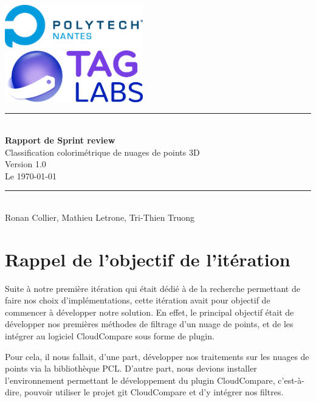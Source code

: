 \documentclass[12pt,titlepage,french]{article}
\begin{document}

\begin{titlepage}
\newcommand{\HRule}{\rule{\linewidth}{0.5mm}}
\center

  \includegraphics[width=0.45\textwidth]{../../ressources/img_logos/logo_polytech.png}\\[1cm]

  \includegraphics[width=0.45\textwidth]{../../ressources/img_logos/logo_taglabs.png}


\HRule \\[0.4cm]
{ \huge \bfseries Rapport de Sprint review\\[0.15cm] }
Classification colorimétrique de nuages de points 3D\\
Version 1.0\\
Le \today \\
\HRule \\[1.5cm]
Ronan Collier,
Mathieu Letrone,
Tri-Thien Truong
\\[1cm]
\end{titlepage}

\tableofcontents %
\newpage

\section{Rappel de l'objectif de l'itération}

Suite à notre première itération qui était dédié à de la recherche permettant de faire nos choix d'implémentations, cette itération avait pour objectif de commencer à développer notre solution. En effet, le principal objectif était de développer nos premières méthodes de filtrage d'un nuage de points, et de les intégrer au logiciel CloudCompare sous forme de plugin.

Pour cela, il nous fallait, d'une part, développer nos traitements sur les nuages de points via la bibliothèque PCL. D'autre part, nous devions installer l'environnement permettant le développement du plugin CloudCompare, c'est-à-dire, pouvoir utiliser le projet git CloudCompare et d'y intégrer nos filtres.
\end{document}
